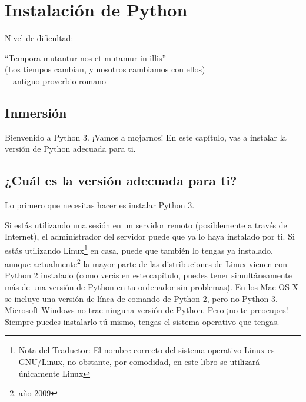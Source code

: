 
\chapter{Instalación de Python}\label{ch:instalacion}

\noindent
Nivel de dificultad:\difl

\begin{citaCap}
``Tempora mutantur nos et mutamur in illis''\\
(Los tiempos cambian, y nosotros cambiamos con ellos)\\
---antiguo proverbio romano
\end{citaCap}

\section{Inmersión}

Bienvenido a Python 3. ¡Vamos a mojarnos! En este capítulo, vas a instalar la versión de Python adecuada para ti.

\section{¿Cuál es la versión adecuada para ti?}

Lo primero que necesitas hacer es instalar Python 3.

Si estás utilizando una sesión en un servidor remoto (posiblemente a través de Internet), el administrador del servidor puede que ya lo haya instalado por ti. Si estás utilizando Linux\footnote{Nota del Traductor: El nombre correcto del sistema operativo Linux es GNU/Linux, no obstante, por comodidad, en este libro se utilizará únicamente Linux} en casa, puede que también lo tengas ya instalado, aunque actualmente\footnote{año 2009} la mayor parte de las distribuciones de Linux vienen con Python 2 instalado (como verás en este capítulo, puedes tener simultáneamente más de una versión de Python en tu ordenador sin problemas). En los Mac OS X se incluye una versión de línea de comando de Python 2, pero no Python 3. Microsoft Windows no trae ninguna versión de Python. Pero ¡no te preocupes! Siempre puedes instalarlo tú mismo, tengas el sistema operativo que tengas.

